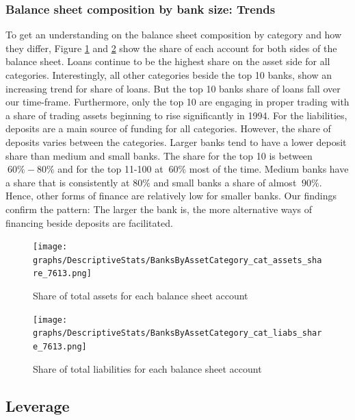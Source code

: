 \documentclass[12pt, a4paper]{article} %
\begin{document}
\subsubsection{Balance sheet composition by bank size: Trends}
\label{sec:CompositionByBankSize}

To get an understanding on the balance sheet composition by category and how they differ, Figure \ref{fig:catAssetsShare} and \ref{fig:catLiabShare} show the share of each account for both sides of the balance sheet. Loans continue to be the highest share on the asset side for all categories. Interestingly, all other categories beside the top 10 banks, show an increasing trend for share of loans. But the top 10 banks share of loans fall over our time-frame. Furthermore, only the top 10 are engaging in proper trading with a share of trading assets beginning to rise significantly in 1994.
For the liabilities, deposits are a main source of funding for all categories. However, the share of deposits varies between the categories. Larger banks tend to have a lower deposit share than medium and small banks. The share for the top 10 is between $~60\%-80\%$ and for the top 11-100 at $~60\%$ most of the time. Medium banks have a share that is consistently at $80\%$ and small banks a share of almost $~90\%$. Hence, other forms of finance are relatively low for smaller banks. Our findings confirm the pattern: The larger the bank is, the more alternative ways of financing beside deposits are facilitated.


\begin{figure}[H]
\begin{minipage}{\textwidth}
\texttt{[image: graphs/DescriptiveStats/BanksByAssetCategory\_cat\_assets\_share\_7613.png]}
\caption[1]{Share of total assets for each balance sheet account}
\label{fig:catAssetsShare}
\end{minipage}
\end{figure}


\begin{figure}[H]
\begin{minipage}{\textwidth}
\texttt{[image: graphs/DescriptiveStats/BanksByAssetCategory\_cat\_liabs\_share\_7613.png]}
\caption[1]{Share of total liabilities for each balance sheet account}
\label{fig:catLiabShare}
\end{minipage}
\end{figure}

\newpage


\subsection{Leverage}
\end{document}

